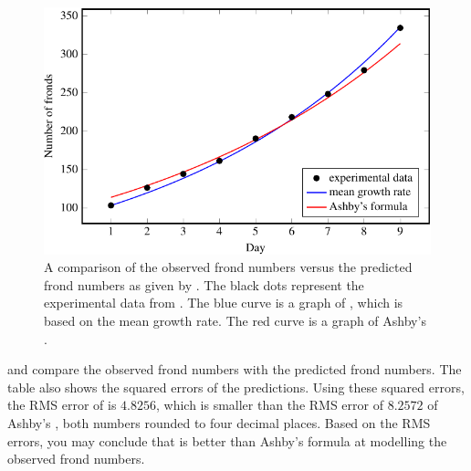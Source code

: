 \documentclass[a4paper,oneside,12pt]{article}
\begin{document}
\begin{problem}
{\begin{solution}
\begin{figure}[!htbp]
\centering
\includegraphics[scale=1.1]{image/11/frond12-estimated-b.pdf}
\caption{%
  A comparison of the observed frond numbers versus the predicted
  frond numbers as given by
  .
  The black dots
  represent the experimental data from
  .  The blue curve is a graph of
  , which is based
  on the mean growth rate.  The red curve is a graph of Ashby's
  .
}
\label{fig:frond12_theory_data}
\end{figure}

 and
 compare the observed frond numbers
with the predicted frond numbers.  The table also shows the squared
errors of the predictions.  Using these squared errors, the RMS error
of  is
$4.8256$, which is smaller than the RMS error of $8.2572$ of Ashby's
, both numbers rounded to
four decimal places.  Based on the RMS errors, you may conclude that
 is better than
Ashby's formula at modelling the observed frond numbers.

\begin{table}[!htbp]
\centering

\caption{%
  Comparison of the observed frond numbers versus the predicted frond
  numbers.  The predicted frond numbers as calculated by
  are listed, respectively, in the third and fourth columns.  These
  numbers have been rounded to one decimal place.  The fifth and sixth
  columns show the squared errors of the predictions.  Although the
  squared errors have been rounded to four decimal places in order to
  fit the table, you should not round these intermediate results when
  you calculate the RMS error.
}
\label{tab:frond12_compare_mean_Ashby}
\end{table}


\end{solution}}
\end{problem}
\end{document}
